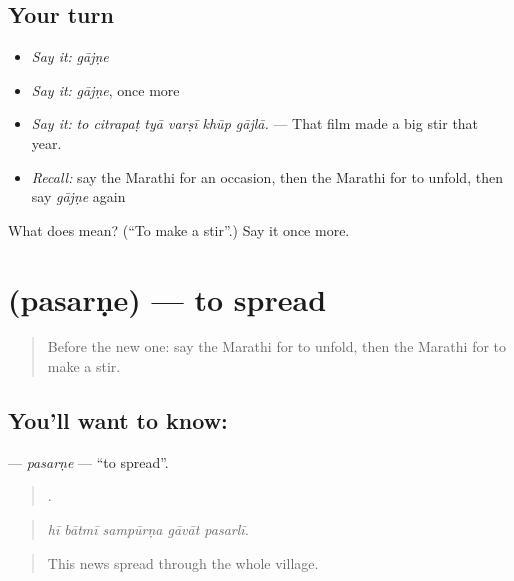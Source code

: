 \subsection*{Your turn}
\begin{itemize}
\raggedright
  \item \emph{Say it:} \emph{gājṇe}
  \item \emph{Say it:} \emph{gājṇe}, once more
  \item \emph{Say it:} \emph{to citrapaṭ tyā varṣī khūp gājlā.} — That film made a big stir that year.
  \item \emph{Recall:} say the Marathi for an occasion, then the Marathi for to unfold, then say \emph{gājṇe} again
\end{itemize}

\begin{tcolorbox}[breakable,colback=teal!4,colframe=teal!35!black,title={Before you move on}]
What does  mean? (\textquotedblleft{}To make a stir\textquotedblright{}.) Say it once more.
\end{tcolorbox}
\section[\texorpdfstring{\mr{पसरणे} (pasarṇe)}{पसरणे (pasarṇe)}]{ (pasarṇe) — to spread}

\label{lesson:MR-C304-pasarne}



\begin{quote}
Before the new one: say the Marathi for to unfold, then the Marathi for to make a stir.
\end{quote}

\subsection*{You'll want to know: }
\textbf{} — \emph{pasarṇe} — \textquotedblleft{}to spread\textquotedblright{}.

\begin{quote}
    .
\end{quote}

\begin{quote}
\emph{hī bātmī sampūrṇa gāvāt pasarlī.}
\end{quote}

\begin{quote}
This news spread through the whole village.
\end{quote}

